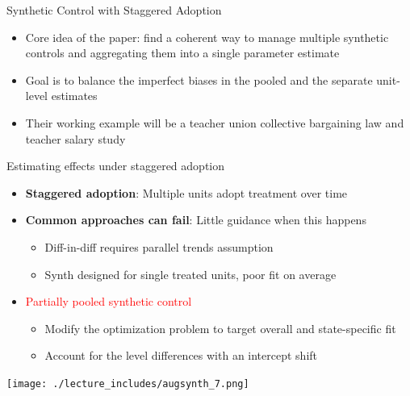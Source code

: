 \documentclass{beamer}
\begin{document}
\begin{frame}{Synthetic Control with Staggered Adoption}

\begin{itemize}
\item Core idea of the paper:  find a coherent way to manage multiple synthetic controls and aggregating them into a single parameter estimate
\item Goal is to balance the imperfect biases in the pooled and the separate unit-level estimates
\item Their working example will be a teacher union collective bargaining law and teacher salary study
\end{itemize}

\end{frame}

\begin{frame}{Estimating effects under staggered adoption}

\begin{itemize}
\item \textbf{Staggered adoption}: Multiple units adopt treatment over time
\item \textbf{Common approaches can fail}: Little guidance when this happens
	\begin{itemize}
	\item Diff-in-diff requires parallel trends assumption
	\item Synth designed for single treated units, poor fit on average
	\end{itemize}
\item \textcolor{red}{Partially pooled synthetic control}
	\begin{itemize}
	\item Modify the optimization problem to target overall and state-specific fit
	\item Account for the level differences with an intercept shift
	\end{itemize}
\end{itemize}
\end{frame}



\begin{frame}
\begin{center}
\texttt{[image: ./lecture\_includes/augsynth\_7.png]}
\end{center}
\end{frame}
\end{document}
